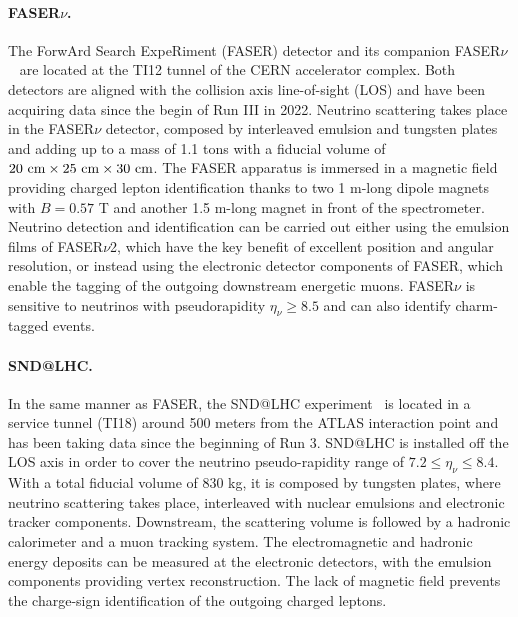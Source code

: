 \paragraph{FASER$\nu$.}
%
The ForwArd Search ExpeRiment (FASER) detector
and its companion FASER$\nu$~\cite{FASER:2019aik,FASER:2019dxq,FASER:2023zcr,FASER:2022hcn}
are located at the TI12 tunnel of the CERN accelerator complex.
%
Both detectors are aligned
with the collision axis line-of-sight (LOS)
and have been acquiring data since the begin of Run III in 2022.
%
Neutrino scattering takes place in the FASER$\nu$
detector, composed by interleaved emulsion and tungsten plates and
adding up to a mass of 1.1 tons with a fiducial volume of $20~\rm{cm} \times 25~\rm{cm} \times 30~{\rm cm}$.
%
The FASER apparatus is immersed in a magnetic field  providing charged lepton
identification thanks to two 1 m-long dipole magnets with $B=0.57$ T
and another 1.5 m-long magnet in front of the spectrometer. 
%
Neutrino detection and identification can be carried out either using the emulsion
films of FASER$\nu$2, which have the key benefit of excellent position and angular resolution,
or instead using the electronic detector components of FASER, which enable the tagging
of the outgoing downstream energetic muons.
%
FASER$\nu$ is sensitive to neutrinos with pseudorapidity $\eta_\nu \ge 8.5$
and can also identify charm-tagged events.


\paragraph{SND@LHC.}
%
In the same manner as FASER, the SND@LHC experiment~\cite{SNDLHC:2022ihg}
is located in a service tunnel (TI18)
around 500 meters from the ATLAS interaction point and has been taking data
since the  beginning of Run 3.
%
SND@LHC is installed off the LOS axis in order to cover the neutrino
pseudo-rapidity range of $7.2 \le \eta_\nu \le 8.4$.
%
With a total fiducial volume of 830 kg, it is composed by tungsten plates,
where neutrino scattering takes place, interleaved with nuclear emulsions and electronic tracker
components.
%
Downstream, the scattering volume is followed by a hadronic calorimeter and a muon tracking system.
%
The electromagnetic
 and hadronic energy deposits can be measured at the electronic detectors, with the emulsion
 components providing vertex reconstruction.
 The lack of magnetic field prevents the charge-sign identification of the outgoing charged leptons.

